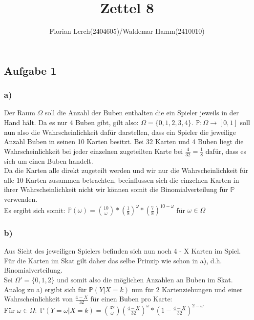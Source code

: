 \documentclass[11pt]{amsart}
\title{Zettel 8}
\author{Florian Lerch(2404605)/Waldemar Hamm(2410010)}
\begin{document}
\maketitle

\subsection*{Aufgabe 1}

\subsubsection*{a)}

Der Raum $\Omega$ soll die Anzahl der Buben enthalten die ein Spieler jeweils in der Hand hält. Da es nur 4
Buben gibt, gilt also: $\Omega = \{0,1,2,3,4\}$. $\mathbb{P}: \Omega \rightarrow [0,1]$ soll nun also  die Wahrscheinlichkeit
dafür darstellen, dass ein Spieler die jeweilige Anzahl Buben in seinen 10 Karten besitzt.
Bei 32 Karten und 4 Buben liegt die Wahrscheinlichkeit bei jeder einzelnen zugeteilten Karte bei $\frac{4}{32} =
\frac{1}{8}$ dafür, dass es sich um einen Buben handelt.\\
Da die Karten alle direkt zugeteilt werden und wir nur die Wahrscheinlichkeit für alle 10 Karten zusammen betrachten,
beeinflussen sich die einzelnen Karten in ihrer Wahrscheinlichkeit nicht wir können somit die Binomialverteilung
für $\mathbb{P}$ verwenden.\\
Es ergibt sich somit: $\mathbb{P}(\omega) = \binom{10}{\omega}*(\frac{1}{8})^{\omega}*(\frac{7}{8})^{10-\omega}$ für $\omega \in \Omega$

\subsubsection*{b)}

Aus Sicht des jeweiligen Spielers befinden sich nun noch 4 - X Karten im Spiel. Für die Karten im Skat gilt
daher das selbe Prinzip wie schon in a), d.h. Binomialverteilung. \\
Sei $\Omega' = \{0,1,2\}$ und somit also die möglichen Anzahlen an Buben im Skat. \\
Analog zu a) ergibt sich für $\mathbb{P}(Y|X = k)$ nun für 2 Kartenziehungen und einer Wahrscheinlichkeit
von $\frac{4-X}{32}$ für einen Buben pro Karte:\\
Für $\omega \in \Omega:$ $\mathbb{P}(Y = \omega |X = k) = \binom{32}{\omega}(\frac{4-X}{32})^{\omega} * (1 - \frac{4-X}{32})^{2 - \omega}$
\end{document}
